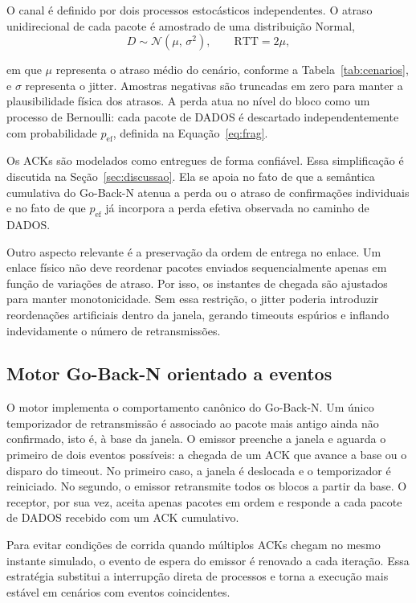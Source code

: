 \documentclass[12pt]{article}
\begin{document}
O canal é definido por dois processos estocásticos independentes. O atraso unidirecional
de cada pacote é amostrado de uma distribuição Normal,
\begin{equation}
  D \sim \mathcal{N}(\mu,\,\sigma^2), \qquad \text{RTT} = 2\mu,
  \label{eq:delay}
\end{equation}

em que $\mu$ representa o atraso médio do cenário, conforme a Tabela~\ref{tab:cenarios}, e
$\sigma$ representa o jitter. Amostras negativas são truncadas em zero para manter a
plausibilidade física dos atrasos. A perda atua no nível do bloco como um processo de
Bernoulli: cada pacote de DADOS é descartado independentemente com probabilidade
$p_{\text{ef}}$, definida na Equação~\ref{eq:frag}.

Os ACKs são modelados como entregues de forma confiável. Essa simplificação é discutida na
Seção~\ref{sec:discussao}. Ela se apoia no fato de que a semântica cumulativa do
Go-Back-N atenua a perda ou o atraso de confirmações individuais e no fato de que
$p_{\text{ef}}$ já incorpora a perda efetiva observada no caminho de DADOS.

Outro aspecto relevante é a preservação da ordem de entrega no enlace. Um enlace físico
não deve reordenar pacotes enviados sequencialmente apenas em função de variações de
atraso. Por isso, os instantes de chegada são ajustados para manter monotonicidade. Sem
essa restrição, o jitter poderia introduzir reordenações artificiais dentro da janela,
gerando timeouts espúrios e inflando indevidamente o número de retransmissões.

\subsection{Motor Go-Back-N orientado a eventos}
\label{sec:motor}

O motor implementa o comportamento canônico do Go-Back-N. Um único temporizador de
retransmissão é associado ao pacote mais antigo ainda não confirmado, isto é, à base da
janela. O emissor preenche a janela e aguarda o primeiro de dois eventos possíveis: a
chegada de um ACK que avance a base ou o disparo do timeout. No primeiro caso, a janela é
deslocada e o temporizador é reiniciado. No segundo, o emissor retransmite todos os blocos
a partir da base. O receptor, por sua vez, aceita apenas pacotes em ordem e responde a
cada pacote de DADOS recebido com um ACK cumulativo.

Para evitar condições de corrida quando múltiplos ACKs chegam no mesmo instante simulado,
o evento de espera do emissor é renovado a cada iteração. Essa estratégia substitui a
interrupção direta de processos e torna a execução mais estável em cenários com eventos
coincidentes.
\end{document}
